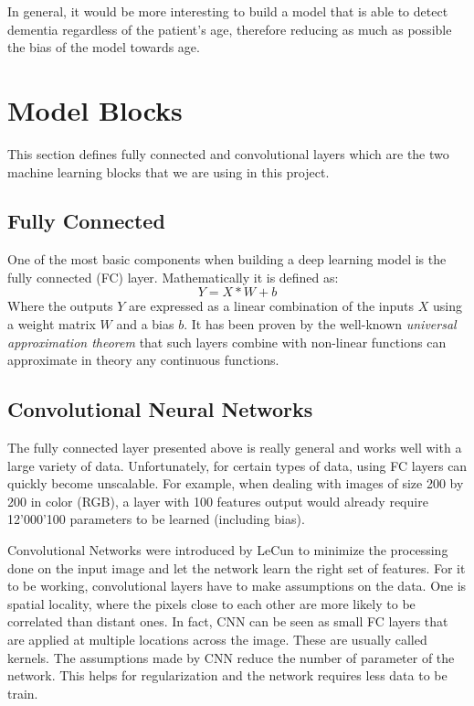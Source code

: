 In general, it would be more interesting to build a model that is able to detect dementia regardless of the patient's age, therefore reducing as much as possible the bias of the model towards age.


\section{Model Blocks}
This section defines fully connected and convolutional layers which are the two machine learning blocks that we are using in this project.
\subsection{Fully Connected}

One of the most basic components when building a deep learning model is the fully connected (FC) layer. Mathematically it is defined as:
$$Y=X*W + b$$
Where the outputs $Y$ are expressed as a linear combination of the inputs $X$ using a weight matrix $W$ and a bias $b$. It has been proven by the well-known \textit{universal approximation theorem}\cite{universal_approx_theorem_10.5555/70405.70408} that such layers combine with non-linear functions can approximate in theory any continuous functions.

\subsection{Convolutional Neural Networks}

The fully connected layer presented above is really general and works well with a large variety of data. Unfortunately, for certain types of data, using FC layers can quickly become unscalable. For example, when dealing with images of size 200 by 200 in color (RGB), a layer with 100 features output would already require 12'000'100 parameters to be learned (including bias). 

Convolutional Networks\cite{cnn_original_paper_10.5555/646469.691875} were introduced by LeCun to minimize the processing done on the input image and let the network learn the right set of features. For it to be working, convolutional layers have to make assumptions on the data. One is spatial locality, where the pixels close to each other are more likely to be correlated than distant ones. In fact, CNN can be seen as small FC layers that are applied at multiple locations across the image. These are usually called kernels. The assumptions made by CNN reduce the number of parameter of the network. This helps for regularization and the network requires less data to be train.



